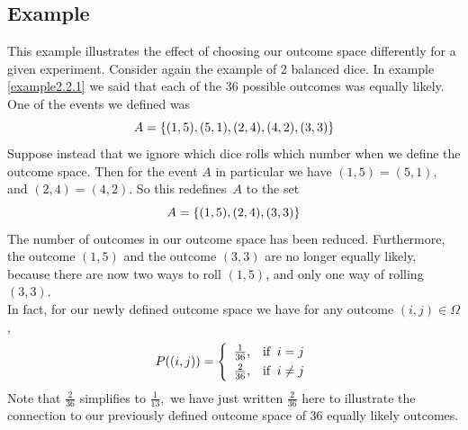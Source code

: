 \subsection{Example} \label{example2.2.4}
This example illustrates the effect of choosing our outcome space differently for a given experiment. Consider again the example of 2 balanced dice. In example \ref{example2.2.1} we said that each of the 36 possible outcomes was equally likely. One of the events we defined was
\[
A = \left\{(1,5),(5,1),(2,4),(4,2),(3,3)\right\}
\]
\noindent Suppose instead that we ignore which dice rolls which number when we define the outcome space. Then for the event $A$ in particular we have $(1,5) = (5,1)$, and $(2,4) = (4,2)$. So this redefines~$A$ to the set
\[
A = \left\{(1,5),(2,4),(3,3)\right\}
\]
The number of outcomes in our outcome space has been reduced. Furthermore, the outcome $(1,5)$ and the outcome $(3,3)$ are no longer equally likely, because there are now two ways to roll $(1,5)$, and only one way of rolling $(3,3).$ \\

\noindent In fact, for our newly defined outcome space we have for any outcome $(i,j) \in \Omega$,
\[
\scases{P((i,j))}{\frac{1}{36}}{\text{if}\;\; i = j}{\frac{2}{36}}{\text{if}\;\;i \neq j}
\]
Note that $\frac{2}{36}$ simplifies to $\frac{1}{13},$ we have just written $\frac{2}{36}$ here to illustrate the connection to our previously defined outcome space of 36 equally likely outcomes.

